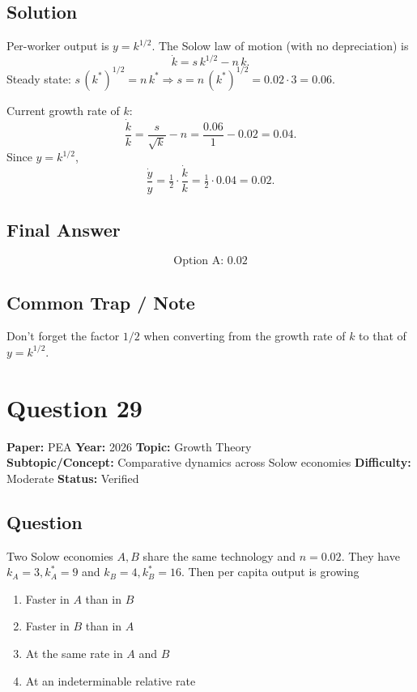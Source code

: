 \documentclass[11pt]{article}
\begin{document}
\subsection*{Solution}
Per-worker output is $y = k^{1/2}$. The Solow law of motion (with no depreciation) is
\[
\dot k = s\,k^{1/2} - n\,k.
\]
Steady state: $s\,(k^*)^{1/2} = n\,k^* \Rightarrow s = n\,(k^*)^{1/2} = 0.02 \cdot 3 = 0.06$.

Current growth rate of $k$:
\[
\frac{\dot k}{k} = \frac{s}{\sqrt k} - n = \frac{0.06}{1} - 0.02 = 0.04.
\]
Since $y = k^{1/2}$,
\[
\frac{\dot y}{y} = \tfrac{1}{2}\cdot \frac{\dot k}{k} = \tfrac{1}{2}\cdot 0.04 = 0.02.
\]

\subsection*{Final Answer}
\[
\boxed{\text{Option A: } 0.02}
\]

\subsection*{Common Trap / Note}
Don't forget the factor $1/2$ when converting from the growth rate of $k$ to that of $y = k^{1/2}$.

\section*{Question 29}
\textbf{Paper:} PEA \quad \textbf{Year:} 2026 \quad \textbf{Topic:} Growth Theory \\
\textbf{Subtopic/Concept:} Comparative dynamics across Solow economies \quad
\textbf{Difficulty:} Moderate \quad \textbf{Status:} Verified

\subsection*{Question}
Two Solow economies $A, B$ share the same technology and $n = 0.02$. They have
$k_A = 3, k^*_A = 9$ and $k_B = 4, k^*_B = 16$. Then per capita output is growing
\begin{enumerate}[label=(\Alph*)]
\item Faster in $A$ than in $B$
\item Faster in $B$ than in $A$
\item At the same rate in $A$ and $B$
\item At an indeterminable relative rate
\end{enumerate}
\end{document}

